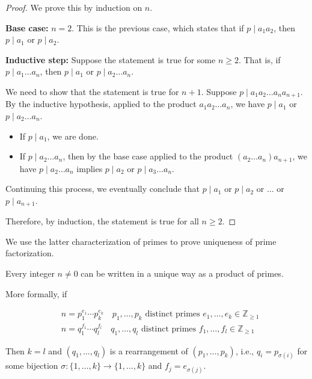 \documentclass[11pt]{article}
\begin{document}
\begin{proof}
    We prove this by induction on \(n\).

    \textbf{Base case:} \(n = 2\). This is the previous case, which states that if \(p \mid a_1 a_2\), then \(p \mid a_1\) or \(p \mid a_2\).

    \textbf{Inductive step:} Suppose the statement is true for some \(n \geq 2\). That is, if \(p \mid a_1 \ldots a_n\), then \(p \mid a_1\) or \(p \mid a_2 \ldots a_n\).

    We need to show that the statement is true for \(n + 1\). Suppose \(p \mid a_1
    a_2 \ldots a_n a_{n+1}\). By the inductive hypothesis, applied to the product
    \(a_1 a_2 \ldots a_n\), we have \(p \mid a_1\) or \(p \mid a_2 \ldots a_n\).
    \begin{itemize}
        \item If \(p \mid a_1\), we are done.
        \item If \(p \mid a_2 \ldots a_n\), then by the base case applied to the product
              \((a_2 \ldots a_n) a_{n+1}\), we have \(p \mid a_2 \ldots a_n\) implies \(p
              \mid a_2\) or \(p \mid a_3 \ldots a_n\).
    \end{itemize}
    Continuing this process, we eventually conclude that \(p \mid a_1\) or \(p \mid a_2\) or \(\ldots\) or \(p \mid a_{n+1}\).

    Therefore, by induction, the statement is true for all \(n \geq 2\).
\end{proof}

We use the latter characterization of primes to prove uniqueness of prime
factorization.
\begin{theorem}
    Every integer \(n \neq 0\) can be written in a unique way as a product of primes.

    More formally, if

    \[
        \begin{aligned}
             & n = p_1^{e_1} \cdots p_k^{e_k} \quad p_1, \ldots, p_k \text{ distinct primes } e_1, \ldots, e_k \in \mathbb{Z}_{\geq 1} \\
             & n = q_1^{f_1} \cdots q_l^{f_l} \quad q_1, \ldots, q_l \text{ distinct primes } f_1, \ldots, f_l \in \mathbb{Z}_{\geq 1}
        \end{aligned}
    \]

    Then \(k = l\) and \((q_1, \ldots, q_l)\) is a rearrangement of \((p_1, \ldots,
    p_k)\), i.e., \(q_i = p_{\sigma(i)}\) for some bijection \(\sigma: \{1, \ldots,
    k\} \rightarrow \{1, \ldots, k\}\) and \(f_j = e_{\sigma(j)}\).
\end{theorem}
\end{document}
